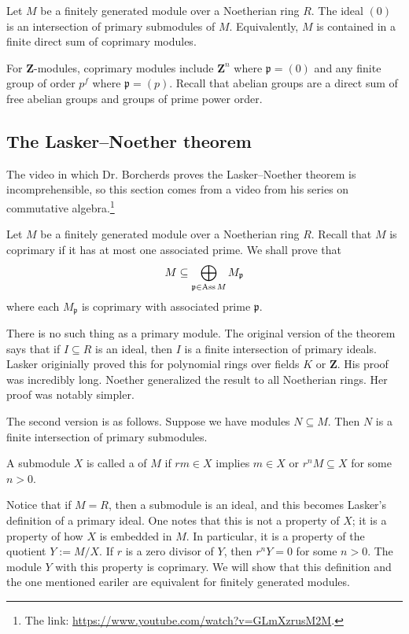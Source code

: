 \documentclass [11 pt, oneside, margin = 1 in] {article}
\begin{document}
\begin{theorem}\label{}\index{}\text{}
Let $M$ be a finitely generated module over a Noetherian ring $R$. The ideal $(0)$ is an intersection of primary submodules of $M$. Equivalently, $M$ is contained in a finite direct sum of coprimary modules.
\end{theorem}

For $\mathbf{Z}$-modules, coprimary modules include $\mathbf{Z}^n$ where $\mathfrak{p}=(0)$ and any finite group of order $p^f$ where $\mathfrak{p} = (p)$. Recall that abelian groups are a direct sum of free abelian groups and groups of prime power order.

\subsection{The Lasker--Noether theorem}
The video in which Dr. Borcherds proves the Lasker--Noether theorem is incomprehensible, so this section comes from a video from his series on commutative algebra.\footnote{The link: \url{https://www.youtube.com/watch?v=GLmXzrusM2M}.}

Let $M$ be a finitely generated module over a Noetherian ring $R$. Recall that $M$ is coprimary if it has at most one associated prime. We shall prove that
\begin{align*}
	M \subseteq \bigoplus_{\mathfrak{p}\in \operatorname{Ass} M} M_{\mathfrak{p}}
\end{align*}
where each $M_{\mathfrak{p}}$ is coprimary with associated prime $ \mathfrak{p}$. 

There is no such thing as a primary module. The original version of the theorem says that if $I\subseteq R$ is an ideal, then $I$ is a finite intersection of primary ideals. Lasker originially proved this for polynomial rings over fields $K$ or $\mathbf{Z}$. His proof was incredibly long. Noether generalized the result to all Noetherian rings. Her proof was notably simpler.

The second version is as follows. Suppose we have modules $N\subseteq M$. Then $N$ is a finite intersection of primary submodules.

\begin{definition}[ ]\label{}\text{}
A submodule $X$ is called a  of $M$ if $rm\in X$ implies $m\in X$ or $r^nM\subseteq X$ for some $n>0$.
\end{definition}

Notice that if $M=R$, then a submodule is an ideal, and this becomes Lasker's definition of a primary ideal. One notes that this is not a property of $X$; it is a property of how $X$ is embedded in $M$. In particular, it is a property of the quotient $Y:= M/X$. If $r$ is a zero divisor of $Y$, then $r^nY=0$ for some $n>0$. The module $Y$ with this property is coprimary. We will show that this definition and the one mentioned eariler are equivalent for finitely generated modules.
\end{document}
